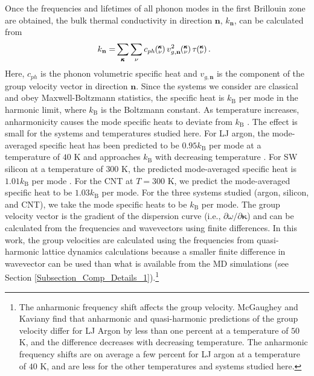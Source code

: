 \documentclass[12pt,twocolumn,iop]{/usr/share/texmf-texlive/tex/latex/iop/iopart}[/usr/share/texmf-texlive/tex/latex/iop/]
\newcommand{\kv}{\mspace{-4.0mu}\left(\mspace{-8.0mu}\begin{smallmatrix}&\pmb{\kappa} \\&\nu\end{smallmatrix}\mspace{-3.0mu}\right)}
\begin{document}
Once the frequencies and lifetimes of all phonon modes in the first
Brillouin zone are obtained, the bulk thermal conductivity in direction
$\mathbf{n}$, $k_{\mathbf{n}}$, can be calculated from \cite{ziman2001}
\begin{equation}\label{E-size:k_bulk}\
\begin{split}
k_{\mathbf{n}}=&\sum_{\pmb{\kappa}} \sum_\nu c_{ph} \kv v^{2}_{g,\mathbf{n}} \kv \tau \kv.
\end{split}
\end{equation}
Here, $c_{ph}$ is the phonon volumetric specific heat and ${v}_{g,\mathbf{n}}$ is
the component of the group velocity vector in direction $\mathbf{n}$. Since the systems we consider are classical and obey Maxwell-Boltzmann statistics,\cite{mcquarrie2000} the
specific heat is $k_{\mathrm{B}}$ per mode in the harmonic limit, where $k_{\mathrm{B}}$ is the Boltzmann constant. As temperature increases, anharmonicity causes the mode specific heats to deviate from $k_{\mathrm{B}}$ \cite{mcgaughey2004c}. The effect is small for the systems and temperatures studied here. For LJ argon, the mode-averaged specific heat has been predicted to be $0.95k_{\mathrm{B}}$ per mode at a temperature of $40$ K and approaches $k_{\mathrm{B}}$ with decreasing temperature \cite{mcgaughey2004c}. For SW silicon at a temperature of $300$ K, the predicted mode-averaged specific heat is $1.01k_{\mathrm{B}}$ per mode \cite{goicochea2010}. For the CNT at $T=300$ K, we predict the mode-averaged specific heat to be $1.03k_{\mathrm{B}}$ per mode. For the three systems studied (argon, silicon, and CNT), we take the mode specific heats to be $k_{\mathrm{B}}$ per mode.  The group
velocity vector is the gradient of the dispersion curve (i.e., $\partial \omega / \partial \pmb{\kappa}$) and can be calculated from the frequencies and wavevectors using finite differences. In this work, the group velocities are calculated using the frequencies from quasi-harmonic lattice dynamics calculations because a smaller finite difference in wavevector can be used than what is available from the MD simulations (see Section \ref{Subsection_Comp_Details_1}).\footnote[2]{The anharmonic frequency shift affects the group velocity. McGaughey and Kaviany find that anharmonic and quasi-harmonic predictions of the group velocity differ for LJ Argon by less than one percent at a temperature of $50$ K, and the difference decreases with decreasing temperature.\cite{mcgaughey2004c} The anharmonic frequency shifts are on average a few percent for LJ argon at a temperature of $40$ K, and are less for the other temperatures and systems studied here.}
\end{document}

